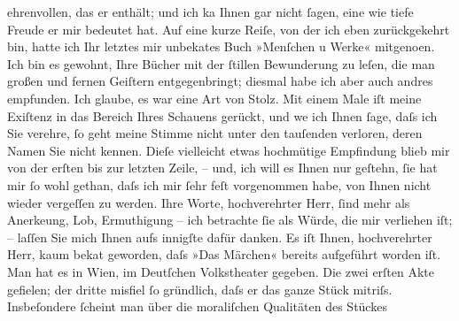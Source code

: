 \begin{ledgroupsized}[t]{13cm}
                    ehrenvollen, das er enthält; und ich ka{\geminationn} Ihnen gar
                    nicht ſagen, eine wie tiefe Freude er mir bedeutet hat. Auf eine kurze Reiſe,
                    von der ich eben zurückgekehrt bin, hatte ich Ihr letztes mir unbeka{\geminationn}tes Buch »Menſchen u
                        Werke« mitgeno{\geminationm}en. Ich bin es
                    gewohnt, Ihre Bücher mit der ſtillen Bewunderung zu leſen, die man großen und
                    fernen Geiſtern entgegen{\pb}bringt; diesmal
                    habe ich aber auch andres empfunden. Ich glaube, es war eine Art von Stolz. Mit
                    einem Male iſt meine Exiſtenz in das Bereich Ihres Schauens gerückt, und we{\geminationn} ich Ihnen ſage, daſs ich Sie verehre, ſo geht
                    meine Stimme nicht unter den tauſenden verloren, deren Namen Sie nicht kennen.
                    Dieſe vielleicht etwas hochmütige Empfindung blieb mir {\pb}von der erſten bis zur letzten Zeile, –
                    und, ich will es Ihnen nur geſtehn, ſie hat mir ſo wohl gethan, daſs ich mir
                    ſehr feſt vorgenommen habe, von Ihnen nicht wieder vergeſſen zu werden. Ihre
                    Worte, hochverehrter Herr, ſind mehr als Anerke{\geminationn}ung, Lob, Ermuthigung – ich betrachte ſie als Würde, die mir verliehen iſt; –
                    laſſen Sie mich Ihnen aufs innigſte dafür {\pb}danken.\pend
           \pstart
           Es iſt Ihnen, hochverehrter Herr, kaum beka{\geminationn}t
                    geworden, daſs »Das Märchen« bereits
                    aufgeführt worden iſt. Man hat es in Wien, im
                        Deutſchen Volkstheater gegeben. Die zwei
                    erſten Akte gefielen; der dritte misfiel ſo gründlich, daſs er das ganze Stück
                    mitriſs. Insbeſondere ſcheint man über die moraliſchen Qualitäten des Stückes

\end{ledgroupsized}
